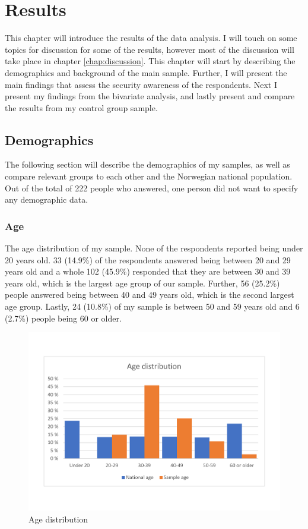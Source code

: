 \chapter{Results}
\label{chap:results}
This chapter will introduce the results of the data analysis. I will touch on some topics for discussion for some of the results, however most of the discussion will take place in chapter \ref{chap:discussion}. This chapter will start by describing the demographics and background of the main sample. Further, I will present the main findings that assess the security awareness of the respondents. Next I present my findings from the bivariate analysis, and lastly present and compare the results from my control group sample. 

\section{Demographics}

The following section will describe the demographics of my samples, as well as compare relevant groups to each other and the Norwegian national population. Out of the total of 222 people who answered, one person did not want to specify any demographic data. 

\subsection{Age}
The age distribution of my sample. None of the respondents reported being under 20 years old. 33 (14.9\%) of the respondents answered being between 20 and 29 years old and a whole 102 (45.9\%) responded that they are between 30 and 39 years old, which is the largest age group of our sample. Further, 56 (25.2\%) people answered being between 40 and 49 years old, which is the second largest age group. Lastly, 24 (10.8\%) of my sample is between 50 and 59 years old and 6 (2.7\%) people being 60 or older. 

\begin{figure}[H]
    \centering
    \includegraphics[scale=0.45]{figures/diagrams/age_ssb.pdf}
    \caption{Age distribution}
    \label{fig:age}
\end{figure}

